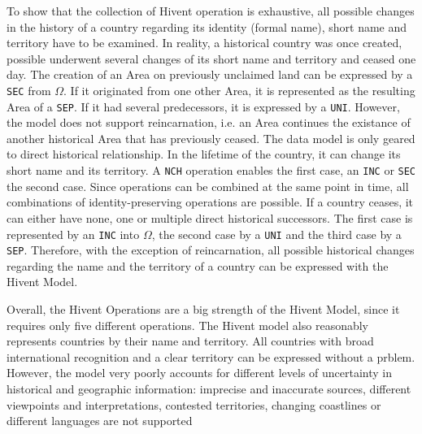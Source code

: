 
To show that the collection of Hivent operation is exhaustive, all possible changes in the history of a country regarding its identity (formal name), short name and territory have to be examined. In reality, a historical country was once created, possible underwent several changes of its short name and territory and ceased one day. The creation of an Area on previously unclaimed land can be expressed by a \texttt{SEC} from $\Omega$. If it originated from one other Area, it is represented as the resulting Area of a \texttt{SEP}. If it had several predecessors, it is expressed by a \texttt{UNI}. However, the model does not support reincarnation, i.e. an Area continues the existance of another historical Area that has previously ceased. The data model is only geared to direct historical relationship. In the lifetime of the country, it can change its short name and its territory. A \texttt{NCH} operation enables the first case, an \texttt{INC} or \texttt{SEC} the second case. Since operations can be combined at the same point in time, all combinations of identity-preserving operations are possible. If a country ceases, it can either have none, one or multiple direct historical successors. The first case is represented by an \texttt{INC} into $\Omega$, the second case by a \texttt{UNI} and the third case by a \texttt{SEP}. Therefore, with the exception of reincarnation, all possible historical changes regarding the name and the territory of a country can be expressed with the Hivent Model.


Overall, the Hivent Operations are a big strength of the Hivent Model, since it requires only five different operations.
The Hivent model also reasonably represents countries by their name and territory. All countries with broad international recognition and a clear territory can be expressed without a prblem. However, the model very poorly accounts for different levels of uncertainty in historical and geographic information: imprecise and inaccurate sources, different viewpoints and interpretations, contested territories, changing coastlines or different languages are not supported


